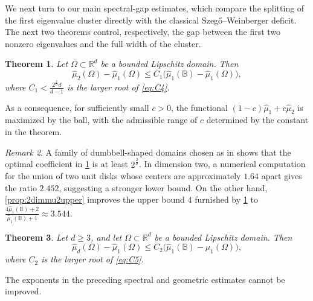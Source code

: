 \documentclass{amsart}
\numberwithin{equation}{section}
\theoremstyle{plain}
\newtheorem{theorem}{Theorem}[section]
\theoremstyle{definition}
\theoremstyle{plain}
\theoremstyle{remark}
\newtheorem{remark}[theorem]{Remark}
\numberwithin{figure}{section}
\newcommand{\B}{\mathbb{B}}
\newcommand{\muu}{\widehat{\mu}}
\begin{document}

We next turn to our main spectral-gap estimates, which compare the splitting of the first eigenvalue cluster directly with the classical Szeg\H{o}--Weinberger deficit. The next two theorems control, respectively, the gap between the first two nonzero eigenvalues and the full width of the cluster.

\begin{theorem}
    \label{thm:mu2}
    Let $\Omega\subset\mathbb{R}^d$ be a bounded Lipschitz domain. Then
    \begin{equation}\label{eq:mu2-mu1}
        \muu_2(\Omega)-\muu_1(\Omega) \leq C_1 \big(\muu_1(\B)-\muu_1(\Omega)\big), 
    \end{equation}
    where $C_1<\frac{2^{\frac{2}{d}}d}{d-1}$ is the larger root of \cref{eq:C4}.
\end{theorem}
As a consequence,  for sufficiently small $c>0$, the functional $(1-c)\muu_1+c\muu_2$ is maximized by the ball, with the admissible range of $c$ determined by the constant in the theorem. 

\begin{remark}
    A family of dumbbell-shaped domains chosen as in \cite[Section 5.2]{AC04} shows that the optimal coefficient in \cref{thm:mu2} is at least $2^{\frac{2}{d}}$. In dimension two, a numerical computation for the union of two unit disks whose centers are approximately $1.64$ apart gives the ratio $2.452$, suggesting a stronger lower bound. On the other hand, \cref{prop:2dimmu2upper} improves the upper bound $4$ furnished by \cref{thm:mu2} to $\frac{4\muu_1(\B)+2}{\muu_1(\B)+1}\approx3.544$.
\end{remark}



\begin{theorem}
    \label{thm:mud}
    Let $d\geq3$, and let $\Omega\subset\mathbb{R}^d$ be a bounded Lipschitz domain. Then
    \begin{equation}
        \label{eq:mud-mu1}
        \muu_d(\Omega)-\muu_1(\Omega)\leq C_2\big(\muu_1(\B)-\muu_1(\Omega)\big),
    \end{equation}
    where   $C_2$ is the larger root of \cref{eq:C5}.
\end{theorem}

The exponents in the preceding spectral and geometric estimates cannot be improved.
\end{document}
